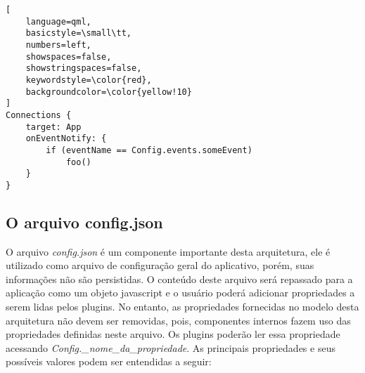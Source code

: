 \begin{center}
\begin{lstlisting}[
	language=qml,
	basicstyle=\small\tt,
    numbers=left,
	showspaces=false,
	showstringspaces=false,
	keywordstyle=\color{red},
	backgroundcolor=\color{yellow!10}
]
Connections {
    target: App
    onEventNotify: {
        if (eventName == Config.events.someEvent)
            foo()
    }
}
\end{lstlisting}
\end{center}


\subsection{O arquivo config.json}\label{sec:solucao-desenvolvida}
O arquivo \textit{config.json} é um componente importante desta arquitetura, ele é utilizado como arquivo de configuração geral do aplicativo, porém, suas informações não são persistidas. O conteúdo deste arquivo será repassado para a aplicação como um objeto javascript e o usuário poderá adicionar propriedades a serem lidas pelos plugins. No entanto, as propriedades fornecidas no modelo desta arquitetura não devem ser removidas, pois, componentes internos fazem uso das propriedades definidas neste arquivo. Os plugins poderão ler essa propriedade acessando \textit{Config.\_nome\_da\_propriedade}. As principais propriedades e seus possíveis valores podem ser entendidas a seguir:

